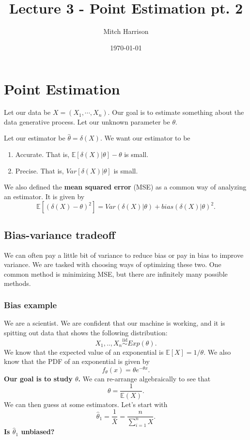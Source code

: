 \documentclass[titlepage, 12pt, leqno]{article}
\title{\Huge{Lecture 3 - Point Estimation pt. 2}}
\author{\large{Mitch Harrison}}
\date{\today}
\begin{document}
\setlength{\parskip}{1\baselineskip}
\setlength{\parindent}{15pt}
\maketitle
\tableofcontents
\newpage


\section{Point Estimation}
Let our data be $X = (X_{1}, \cdots , X_{n})$. Our goal is to estimate
something about the data generative process. Let our unknown parameter be 
$\theta$.

Let our estimator be $\hat \theta = \delta(X)$. We want our estimator to be
\begin{enumerate}
    \item Accurate. That is, $\mathbb{E}[\delta(X)|\theta] - \theta$ is small.
    \item Precise. That is, $Var[\delta(X)|\theta]$ is small.
\end{enumerate}

We also defined the \textbf{mean squared error} (MSE) as a common way of
analyzing an estimator. It is given by
\[
    \mathbb{E}[(\delta(X) - \theta)^{2}] = Var(\delta(X)|\theta) +
    bias(\delta(X) | \theta)^{2}.
\]
\subsection{Bias-variance tradeoff}
We can often pay a little bit of variance to reduce bias or pay in bias to
improve variance. We are tasked with choosing ways of optimizing these two. One
common method is minimizing MSE, but there are infinitely many possible methods.

\subsubsection{Bias example}
We are a scientist. We are confident that our machine is working, and it is
spitting out data that shows the following distribution:
\[
X_{1}, .., X_{n} \overset{\mathrm{iid}}{\sim} Exp(\theta).
\]
We know that the expected value of an exponential is $\mathbb{E}[X] = 1/\theta$.
We also know that the PDF of an exponential is given by
\[
f_{\theta}(x) = \theta e^{-\theta x}.
\]
\textbf{Our goal is to study $\theta$.} We can re-arrange algebraically to 
see that
\[
\theta = \frac{1}{\mathbb{E}(X)}.
\]
We can then guess at some estimators. Let's start with
\[
\hat \theta_{1} = \frac{1}{\bar X} = \frac{n}{\sum_{i=1}^{n} X}.
\]
\textbf{Is $\hat \theta_{1}$ unbiased?}
\end{document}
